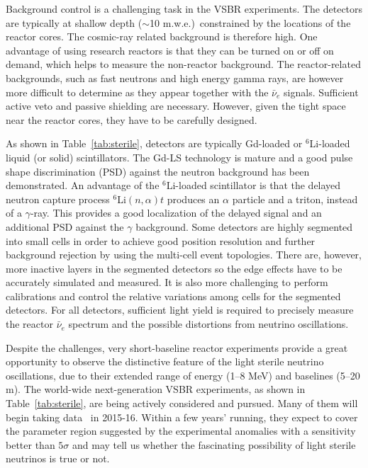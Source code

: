 \documentclass[aps,twocolumn,preprintnumbers,amsmath,superscriptaddress,amssymb,floats,nofootinbib]{revtex4-1}
\begin{document}
Background control is a challenging task in the VSBR experiments. 
The detectors are typically at shallow depth ($\sim$10 m.w.e.)\ constrained by the locations of the reactor cores. 
The cosmic-ray related background is therefore high. 
One advantage of using research reactors is that they can be turned on or off on demand, which helps to measure the non-reactor background. 
The reactor-related backgrounds, such as fast neutrons and high energy gamma rays, are however more difficult to determine
as they appear together with the $\bar\nu_e$ signals. 
Sufficient active veto and passive shielding are necessary. However, given the tight space near the reactor cores,  they have to be carefully designed.

As shown in Table~\ref{tab:sterile}, detectors are typically Gd-loaded or $^{6}$Li-loaded liquid (or solid) scintillators. 
The Gd-LS technology is mature and a good pulse shape discrimination (PSD) against the neutron background has been demonstrated. 
An advantage of the $^{6}$Li-loaded scintillator is that the 
delayed neutron capture process $^{6}$Li$(n,\alpha)t$ produces an $\alpha$ particle and a triton, instead of a $\gamma$-ray. 
This provides a good localization of the delayed signal and an additional PSD against the $\gamma$ background. 
Some detectors are highly segmented into small cells in order to achieve good position resolution and further background rejection by using the multi-cell event topologies. 
There are, however, more inactive layers in the segmented detectors so the edge effects have to be accurately simulated and measured.
It is also more challenging to perform calibrations and control the relative variations among cells for the segmented detectors.
For all detectors, sufficient light yield is required to precisely measure the reactor $\bar\nu_e$ spectrum and the possible distortions from neutrino oscillations.


Despite the challenges, very short-baseline reactor experiments provide a great opportunity to observe the distinctive feature of the light sterile neutrino oscillations, due to their extended range of energy (1--8 MeV) and baselines (5--20 m). 
The world-wide next-generation VSBR experiments, as shown in Table~\ref{tab:sterile}, are being actively considered and pursued.
Many of them will begin taking data~\cite{Lasserre-Neutrino14} in 2015-16. Within a few years' running, they expect to cover the parameter region 
suggested by the experimental anomalies with a sensitivity better than $5\sigma$ and 
may tell us whether the fascinating possibility of light sterile neutrinos is true or not.
\end{document}
